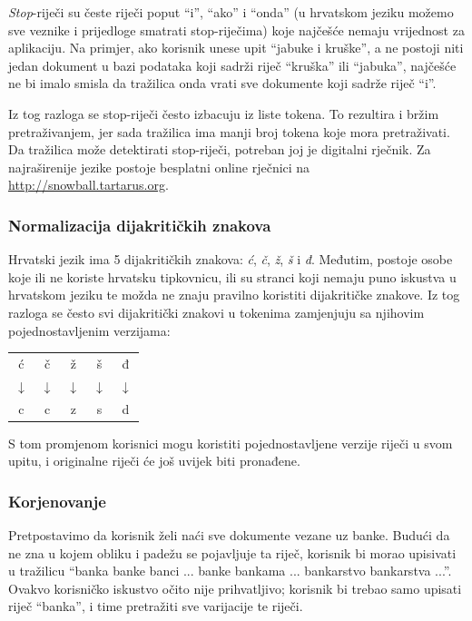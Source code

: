 \documentclass[a4paper,twoside,12pt]{scrreprt}
\newenvironment{nscenter}
 {\par\nopagebreak\centering}
 {\parskip=0pt\par\noindent\ignorespacesafterend}
\begin{document}
\textit{Stop}-riječi su česte riječi poput ``i'', ``ako'' i ``onda'' (u hrvatskom jeziku možemo sve veznike i prijedloge smatrati stop-riječima) koje najčešće nemaju vrijednost za aplikaciju. Na primjer, ako korisnik unese upit ``jabuke i kruške'', a ne postoji niti jedan dokument u bazi podataka koji sadrži riječ ``kruška'' ili ``jabuka'', najčešće ne bi imalo smisla da tražilica onda vrati sve dokumente koji sadrže riječ ``i''.

Iz tog razloga se stop-riječi često izbacuju iz liste tokena. To rezultira i bržim pretraživanjem, jer sada tražilica ima manji broj tokena koje mora pretraživati. Da tražilica može detektirati stop-riječi, potreban joj je digitalni rječnik. Za najraširenije jezike postoje besplatni online rječnici na \url{http://snowball.tartarus.org}.

\subsubsection{Normalizacija dijakritičkih znakova}

Hrvatski jezik ima 5 dijakritičkih znakova: \textit{ć}, \textit{č}, \textit{ž}, \textit{š} i \textit{đ}. Međutim, postoje osobe koje ili ne koriste hrvatsku tipkovnicu, ili su stranci koji nemaju puno iskustva u hrvatskom jeziku te možda ne znaju pravilno koristiti dijakritičke znakove. Iz tog razloga se često svi dijakritički znakovi u tokenima zamjenjuju sa njihovim pojednostavljenim verzijama:

\begin{nscenter}
  \begin{tabular}{ccccc}
    ć            & č            & ž            & š            & đ            \\
    $\downarrow$ & $\downarrow$ & $\downarrow$ & $\downarrow$ & $\downarrow$ \\
    c            & c            & z            & s            & d            \\
  \end{tabular}
\end{nscenter}

S tom promjenom korisnici mogu koristiti pojednostavljene verzije riječi u svom upitu, i originalne riječi će još uvijek biti pronađene.

\subsubsection{Korjenovanje}

Pretpostavimo da korisnik želi naći sve dokumente vezane uz banke. Budući da ne zna u kojem obliku i padežu se pojavljuje ta riječ, korisnik bi morao upisivati u tražilicu ``banka banke banci ... banke bankama ... bankarstvo bankarstva ...''. Ovakvo korisničko iskustvo očito nije prihvatljivo; korisnik bi trebao samo upisati riječ ``banka'', i time pretražiti sve varijacije te riječi.
\end{document}
